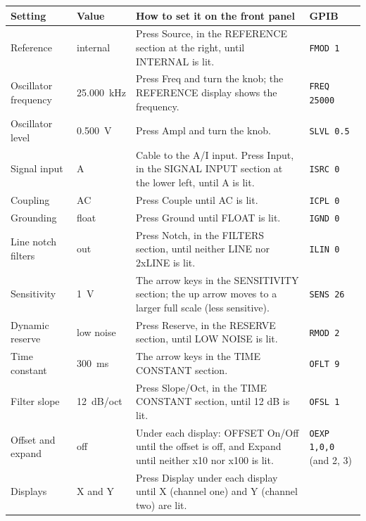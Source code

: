 \documentclass[11pt,a4paper]{article}
\begin{document}
\begin{table}[htbp]
  \centering
  \small
  \begin{tabular}{@{}p{2.3cm}p{2.3cm}p{7.6cm}p{2.1cm}@{}}
    \toprule
    \textbf{Setting} & \textbf{Value} & \textbf{How to set it on the front panel}
      & \textbf{GPIB} \\
    \midrule
    Reference & internal
      & Press Source, in the REFERENCE section at the right, until INTERNAL is lit.
      & \texttt{FMOD 1} \\
    Oscillator frequency & \SI{25.000}{\kilo\hertz}
      & Press Freq and turn the knob; the REFERENCE display shows the frequency.
      & \texttt{FREQ 25000} \\
    Oscillator level & \SI{0.500}{\volt}
      & Press Ampl and turn the knob.
      & \texttt{SLVL 0.5} \\
    Signal input & A
      & Cable to the A/I input. Press Input, in the SIGNAL INPUT section at the
        lower left, until A is lit.
      & \texttt{ISRC 0} \\
    Coupling & AC
      & Press Couple until AC is lit.
      & \texttt{ICPL 0} \\
    Grounding & float
      & Press Ground until FLOAT is lit.
      & \texttt{IGND 0} \\
    Line notch filters & out
      & Press Notch, in the FILTERS section, until neither LINE nor 2xLINE is lit.
      & \texttt{ILIN 0} \\
    Sensitivity & \SI{1}{\volt}
      & The arrow keys in the SENSITIVITY section; the up arrow moves to a larger
        full scale (less sensitive).
      & \texttt{SENS 26} \\
    Dynamic reserve & low noise
      & Press Reserve, in the RESERVE section, until LOW NOISE is lit.
      & \texttt{RMOD 2} \\
    Time constant & \SI{300}{\milli\second}
      & The arrow keys in the TIME CONSTANT section.
      & \texttt{OFLT 9} \\
    Filter slope & \SI{12}{\deci\bel}/oct
      & Press Slope/Oct, in the TIME CONSTANT section, until 12 dB is lit.
      & \texttt{OFSL 1} \\
    Offset and expand & off
      & Under each display: OFFSET On/Off until the offset is off, and Expand
        until neither x10 nor x100 is lit.
      & \texttt{OEXP 1,0,0} (and 2, 3) \\
    Displays & X and Y
      & Press Display under each display until X (channel one) and Y (channel two)
        are lit.

\end{tabular}
\end{table}
\end{document}
